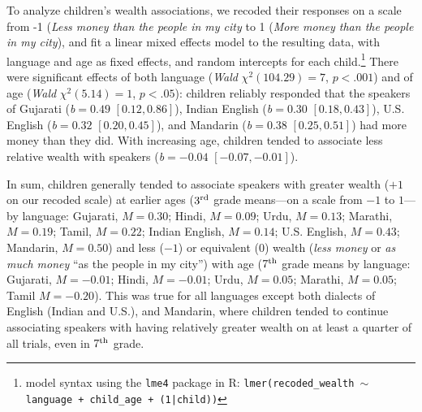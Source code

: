 \documentclass{foushee-adapted-preprint}
\begin{document}
To analyze children's wealth associations, we recoded their responses on a scale from -1 (\textit{Less money than the people in my city} to 1 (\textit{More money than the people in my city}), and fit a linear mixed effects model \cite{barr2013random} to the resulting data, with language and age as fixed effects, and random intercepts for each child.\footnote{model syntax using the \texttt{lme4} package in R: \texttt{lmer(recoded\_wealth $\sim$ language + child\_age + (1|child))}} %
There were significant effects of both language (\textit{Wald} $\chi^2(104.29)=7$, $p<.001$) and of age (\textit{Wald} $\chi^2(5.14)=1$, $p<.05$): children reliably responded that the speakers of Gujarati (\textit{b}$=0.49$ $[0.12, 0.86]$), Indian English (\textit{b}$=0.30$ $[0.18, 0.43]$), U.S. English (\textit{b}$=0.32$ $[0.20, 0.45]$), and Mandarin (\textit{b}$=0.38$ $[0.25, 0.51]$) had more money than they did. With increasing age, children tended to associate less relative wealth with speakers (\textit{b}$=-0.04$ $[-0.07, -0.01]$). 

In sum, children generally tended to associate speakers with greater wealth ($+1$ on our recoded scale) at earlier ages ($3^{\textnormal{rd}}$ grade means---on a scale from $-1$ to $1$---by language: Gujarati, $M=0.30$; Hindi, $M=0.09$; Urdu, $M=0.13$; Marathi, $M=0.19$; Tamil, $M=0.22$; Indian English, $M=0.14$; U.S. English, $M=0.43$; Mandarin, $M=0.50$) and less ($-1$) or equivalent ($0$) wealth (\textit{less money} or \textit{as much money} ``as the people in my city'') with age ($7^{\textnormal{th}}$ grade means by language: Gujarati, $M=-0.01$; Hindi, $M=-0.01$; Urdu, $M=0.05$; Marathi, $M=0.05$; Tamil $M=-0.20$). This was true for all languages except both dialects of English (Indian and U.S.), and Mandarin, where children tended to continue associating speakers with having relatively greater wealth on at least a quarter of all trials, even in $7^{\textnormal{th}}$ grade. %
\end{document}
